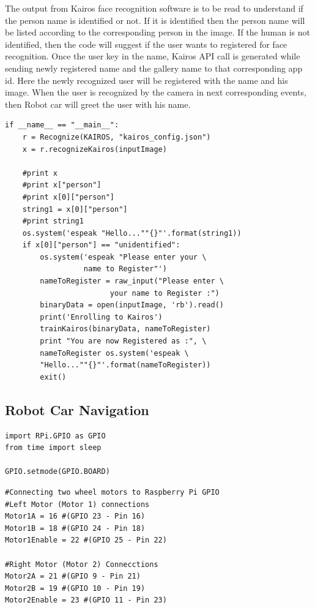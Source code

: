 \documentclass[sigconf]{acmart}
\begin{document}
The output from Kairos face recognition software is to be read to understand if the person name is identified or not. If it is identified then the person name will be listed according to the corresponding person in the image. If the human is not identified, then the code will suggest if the user wants to registered for face recognition. Once the user key in the name, Kairos API call is generated while sending newly registered name and the gallery name to that corresponding app id. Here the newly recognized user will be registered with the name and his image. When the user is recognized by the camera in next corresponding events, then Robot car will greet the user with his name.

\begin{verbatim}
if __name__ == "__main__":
    r = Recognize(KAIROS, "kairos_config.json")
    x = r.recognizeKairos(inputImage)
    
    #print x
    #print x["person"]
    #print x[0]["person"]
    string1 = x[0]["person"]
    #print string1
    os.system('espeak "Hello...""{}"'.format(string1))
    if x[0]["person"] == "unidentified":
        os.system('espeak "Please enter your \ 
                  name to Register"')
        nameToRegister = raw_input("Please enter \ 
                        your name to Register :")
        binaryData = open(inputImage, 'rb').read()
        print('Enrolling to Kairos')
        trainKairos(binaryData, nameToRegister)
        print "You are now Registered as :", \ 
        nameToRegister os.system('espeak \ 
        "Hello...""{}"'.format(nameToRegister))
        exit()
\end{verbatim}

\subsection{Robot Car Navigation}
\begin{verbatim}
import RPi.GPIO as GPIO
from time import sleep

GPIO.setmode(GPIO.BOARD)
\end{verbatim}

\begin{verbatim}
#Connecting two wheel motors to Raspberry Pi GPIO 
#Left Motor (Motor 1) connections
Motor1A = 16 #(GPIO 23 - Pin 16)
Motor1B = 18 #(GPIO 24 - Pin 18)
Motor1Enable = 22 #(GPIO 25 - Pin 22)

#Right Motor (Motor 2) Connecctions
Motor2A = 21 #(GPIO 9 - Pin 21)
Motor2B = 19 #(GPIO 10 - Pin 19)
Motor2Enable = 23 #(GPIO 11 - Pin 23)
\end{verbatim}
\end{document}

